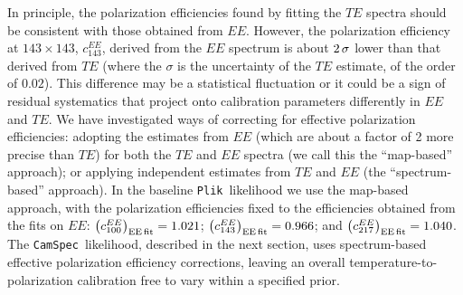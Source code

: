 \documentclass[longauth,traditabstract]{aa}
\def\,{\thinspace}
\newcommand{\camspec}{{\tt CamSpec}}
\newcommand{\plik}{{\tt Plik}}
\newcommand{\calibC}{\ensuremath{c}}
\begin{document}
In principle, the polarization efficiencies found by fitting the $TE$
spectra should be consistent with those obtained from $EE$.  However,
the polarization efficiency at $143\times 143$, $\calibC^{EE}_{143}$,
derived from the $EE$ spectrum is about $2\,\sigma$ lower than that
derived from $TE$ (where the $\sigma$ is the uncertainty of the $TE$
estimate, of the order of $0.02$). This difference may be a
statistical fluctuation or it could be a sign of residual systematics
that project onto calibration parameters differently in $EE$ and
$TE$. We have investigated ways of correcting for effective
polarization efficiencies: adopting the estimates from $EE$ (which are
about a factor of 2 more precise than $TE$) for both the $TE$ and $EE$
spectra (we call this the ``map-based'' approach); or applying
independent estimates from $TE$ and $EE$ (the ``spectrum-based''
approach). In the baseline \plik\ likelihood we use the map-based
approach, with the polarization efficiencies fixed to the efficiencies
obtained from the fits on $EE$:
$\left(\calibC^{EE}_{100}\right)_{\mathrm{EE\, fit}}=1.021$;
$\left(\calibC^{EE}_{143}\right)_{\mathrm{EE\,fit}}=0.966$; and
$\left(\calibC^{EE}_{217}\right)_{\mathrm{EE\,
fit}}=1.040$. The \camspec\ likelihood, described in the next section,
uses spectrum-based effective polarization efficiency corrections,
leaving an overall temperature-to-polarization calibration free to
vary within a specified prior.
\end{document}
